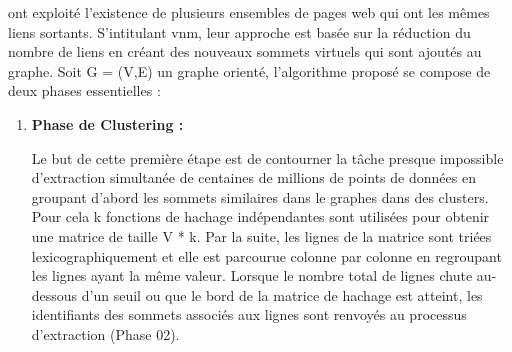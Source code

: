 				\citep{buehrer2008scalable} ont exploité l'existence de plusieurs ensembles de pages web qui ont les mêmes liens sortants. S'intitulant  
				\gls{vnm}, leur approche est basée sur la réduction du nombre de liens en créant des nouveaux sommets virtuels qui sont ajoutés au graphe. Soit G = (V,E) un graphe orienté, l'algorithme proposé se compose de deux phases essentielles :
				\begin{enumerate}
				
				
					\item \textbf{Phase de Clustering :}
					
					Le but de cette première étape est de contourner la tâche presque impossible d'extraction simultanée de centaines de millions de points de données en groupant d'abord les sommets similaires dans le graphes dans des clusters. 
				Pour cela k fonctions de hachage indépendantes sont utilisées pour obtenir une matrice de taille V * k. Par la suite, les lignes de la matrice  sont triées lexicographiquement
				et elle est parcourue colonne par colonne en regroupant les lignes ayant la même valeur. Lorsque le nombre total de lignes chute au-dessous d'un seuil ou que le bord de la matrice de hachage est atteint, les identifiants des sommets associés aux lignes sont renvoyés au processus d'extraction (Phase 02). 
					

\end{enumerate}
